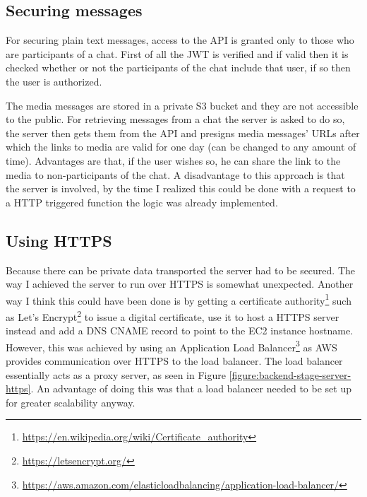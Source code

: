 \subsection{Securing messages}

For securing plain text messages, access to the API is granted only to those who are participants of a chat. First of all the JWT is verified and if valid then it is checked whether or not the participants of the chat include that user, if so then the user is authorized.

The media messages are stored in a private S3 bucket and they are not accessible to the public. For retrieving messages from a chat the server is asked to do so, the server then gets them from the API and presigns media messages' URLs after which the links to media are valid for one day (can be changed to any amount of time). Advantages are that, if the user wishes so, he can share the link to the media to non-participants of the chat. A disadvantage to this approach is that the server is involved, by the time I realized this could be done with a request to a HTTP triggered function the logic was already implemented.

\subsection{Using HTTPS}

Because there can be private data transported the server had to be secured.
The way I achieved the server to run over HTTPS is somewhat unexpected. Another way I think this could have been done is by getting a certificate authority\footnote{\href{https://en.wikipedia.org/wiki/Certificate\_authority}{https://en.wikipedia.org/wiki/Certificate\_authority}} such as Let's Encrypt\footnote{\href{https://letsencrypt.org/}{https://letsencrypt.org/}} to issue a digital certificate, use it to host a HTTPS server instead and add a DNS CNAME record to point to the EC2 instance hostname. However, this was achieved by using an Application Load Balancer\footnote{\href{https://aws.amazon.com/elasticloadbalancing/application-load-balancer/}{https://aws.amazon.com/elasticloadbalancing/application-load-balancer/}} as AWS provides communication over HTTPS to the load balancer. The load balancer essentially acts as a proxy server, as seen in Figure \ref{figure:backend-stage-server-https}. An advantage of doing this was that a load balancer needed to be set up for greater scalability anyway.

